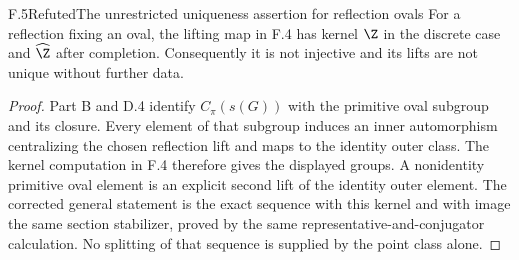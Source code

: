 \begin{claim}{F.5}{Refuted}{The unrestricted uniqueness assertion for reflection ovals}
For a reflection fixing an oval, the lifting map in F.4 has kernel $\Z$ in the discrete case and $\widehat\Z$ after completion. Consequently it is not injective and its lifts are not unique without further data.
\end{claim}
\begin{proof}
Part B and D.4 identify $C_\pi(s(G))$ with the primitive oval subgroup and its closure. Every element of that subgroup induces an inner automorphism centralizing the chosen reflection lift and maps to the identity outer class. The kernel computation in F.4 therefore gives the displayed groups. A nonidentity primitive oval element is an explicit second lift of the identity outer element. The corrected general statement is the exact sequence with this kernel and with image the same section stabilizer, proved by the same representative-and-conjugator calculation. No splitting of that sequence is supplied by the point class alone.
\end{proof}
